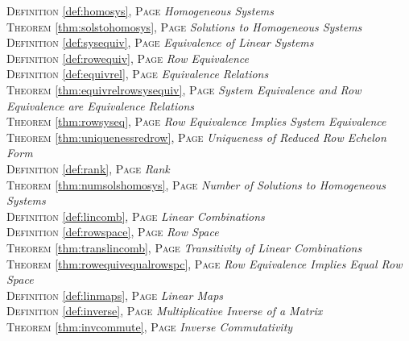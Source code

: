 \begin{multicols}{2}
{\textsc{Definition} \ref{def:homosys}, \textsc{Page} \pageref{def:homosys} \textit{Homogeneous Systems} \\
\textsc{Theorem} \ref{thm:solstohomosys}, \textsc{Page} \pageref{thm:solstohomosys} \textit{Solutions to Homogeneous Systems} \\
\textsc{Definition} \ref{def:sysequiv}, \textsc{Page} \pageref{def:sysequiv} \textit{Equivalence of Linear Systems} \\
\textsc{Definition} \ref{def:rowequiv}, \textsc{Page} \pageref{def:rowequiv} \textit{Row Equivalence} \\
\textsc{Definition} \ref{def:equivrel}, \textsc{Page} \pageref{def:equivrel} \textit{Equivalence Relations} \\
\textsc{Theorem} \ref{thm:equivrelrowsysequiv}, \textsc{Page} \pageref{thm:equivrelrowsysequiv} \textit{System Equivalence and Row Equivalence are Equivalence Relations} \\
\textsc{Theorem} \ref{thm:rowsyseq}, \textsc{Page} \pageref{thm:rowsyseq} \textit{Row Equivalence Implies System Equivalence} \\
\textsc{Theorem} \ref{thm:uniquenessredrow}, \textsc{Page} \pageref{thm:uniquenessredrow} \textit{Uniqueness of Reduced Row Echelon Form} \\
\textsc{Definition} \ref{def:rank}, \textsc{Page} \pageref{def:rank} \textit{Rank} \\
\textsc{Theorem} \ref{thm:numsolshomosys}, \textsc{Page} \pageref{thm:numsolshomosys} \textit{Number of Solutions to Homogeneous Systems} \\
\textsc{Definition} \ref{def:lincomb}, \textsc{Page} \pageref{def:lincomb} \textit{Linear Combinations} \\
\textsc{Definition} \ref{def:rowspace}, \textsc{Page} \pageref{def:rowspace} \textit{Row Space} \\
\textsc{Theorem} \ref{thm:translincomb}, \textsc{Page} \pageref{thm:translincomb} \textit{Transitivity of Linear Combinations} \\
\textsc{Theorem} \ref{thm:rowequivequalrowspc}, \textsc{Page} \pageref{thm:rowequivequalrowspc} \textit{Row Equivalence Implies Equal Row Space} \\
\textsc{Definition} \ref{def:linmaps}, \textsc{Page} \pageref{def:linmaps} \textit{Linear Maps} \\
\textsc{Definition} \ref{def:inverse}, \textsc{Page} \pageref{def:inverse} \textit{Multiplicative Inverse of a Matrix} \\
\textsc{Theorem} \ref{thm:invcommute}, \textsc{Page} \pageref{thm:invcommute} \textit{Inverse Commutativity} \\
}
\end{multicols}
